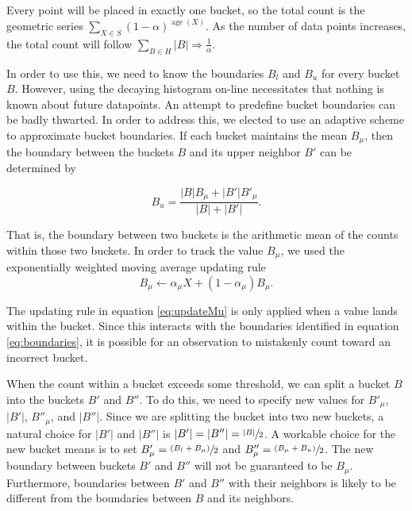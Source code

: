 \documentclass{sigkddExp}
\DeclareMathOperator{\age}{age}
\begin{document}
    Every point will be placed in exactly one bucket, so the total count is the
    geometric series $\sum_{X \in S} (1 - \alpha)^{\age(X)}$. As the number
    of data points increases, the total count will follow $\sum_{B \in H} |B|
    \Rightarrow \frac{1}{\alpha}$.

    In order to use this, we need to know the boundaries $B_l$ and $B_u$ for
    every bucket $B$. However, using the decaying histogram on-line necessitates
    that nothing is known about future datapoints. An attempt to predefine
    bucket boundaries can be badly thwarted. In order to address this, we
    elected to use an adaptive scheme to approximate bucket boundaries. If each
    bucket maintains the mean $B_{\mu}$, then the boundary between the
    buckets $B$ and its upper neighbor $B'$ can be determined by

    \begin{equation}
    \label{eq:boundaries}
        B_u =
            \frac{|B| B_{\mu} + |B'| B'_{\mu}}
                 {|B| + |B'|}.
    \end{equation}

    That is, the boundary between two buckets is the arithmetic mean of the
    counts within those two buckets. In order to track the value $B_{\mu}$, we
    used the exponentially weighted moving average updating rule
    \begin{equation}
    \label{eq:updateMu}
        B_{\mu} \leftarrow \alpha_{\mu} X + (1 - \alpha_{\mu}) B_{\mu}.
    \end{equation}

    The updating rule in equation \ref{eq:updateMu} is only applied when a value
    lands within the bucket. Since this interacts with the boundaries identified
    in equation \ref{eq:boundaries}, it is possible for an observation to
    mistakenly count toward an incorrect bucket.

    When the count within a bucket exceeds some threshold, we can split
    a bucket $B$ into the buckets $B'$ and $B''$. To do this, we need to
    specify new values for $B'_{\mu}$, $|B'|$, $B''_{\mu}$, and
    $|B''|$. Since we are splitting the bucket into two new buckets, a
    natural choice for $|B'|$ and $|B''|$ is $|B'| = |B''| = \sfrac{|B|}{2}$.
    A workable choice for the new bucket means is to set ${B'_{\mu} = \sfrac{(B_l
    + B_{\mu})}{2}}$ and ${B''_{\mu} = \sfrac{(B_{\mu} + B_u)}{2}}$.
    The new boundary between buckets $B'$ and $B''$ will not be
    guaranteed to be $B_{\mu}$. Furthermore, boundaries between $B'$ and $B''$
    with their neighbors is likely to be different from the boundaries between
    $B$ and its neighbors.
\end{document}
